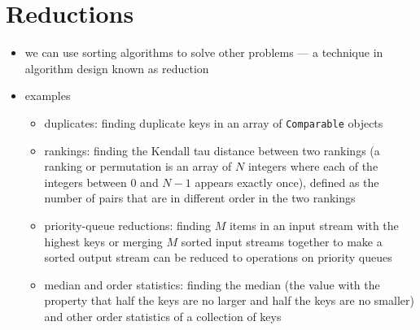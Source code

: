 \documentclass[8pt,a4paper,compress]{beamer}
\begin{document}
\section{Reductions}
\begin{frame}[fragile]
\begin{itemize}
\item we can use sorting algorithms to solve other problems --- a technique in algorithm design known as reduction 

\item examples
\begin{itemize}
\item duplicates: finding duplicate keys in an array of \lstinline$Comparable$ objects
\item rankings: finding the Kendall tau distance between two rankings (a ranking or permutation is an array of $N$ integers where each of the integers between 0 and $N-1$ appears exactly once), defined as the number of pairs that are in different order in the two rankings
\item priority-queue reductions: finding $M$ items in an input stream with the highest keys or merging $M$ sorted input streams together to make a sorted output stream can be reduced to operations on priority queues
\item median and order statistics: finding the median (the value with the property that half the keys are no larger and half the keys are no smaller) and other order statistics of a collection of keys
\end{itemize}
\end{itemize}
\end{frame}
\end{document}
